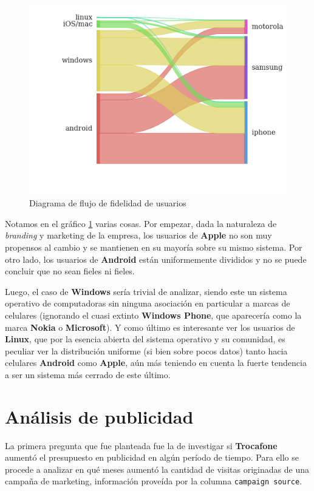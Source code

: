 \documentclass[a4paper]{article}
\begin{document}
\begin{figure}[h!]
	\includegraphics[width=\linewidth]{figures/151-os_brands-sankey.png}
	\caption{Diagrama de flujo de fidelidad de usuarios}
	\label{fig:sankey}
\end{figure}

Notamos en el gráfico \ref{fig:sankey} varias cosas. Por empezar, dada la naturaleza de \textit{branding} y marketing de la empresa, los usuarios de \textbf{Apple} no son muy propensos al cambio y se mantienen en su mayoría sobre su mismo sistema. Por otro lado, los usuarios de \textbf{Android} están uniformemente divididos y no se puede concluir que no sean fieles ni fieles. 

Luego, el caso de \textbf{Windows} sería trivial de analizar, siendo este un sistema operativo de computadoras sin ninguna asociación en particular a marcas de celulares (ignorando el cuasi extinto \textbf{Windows Phone}, que aparecería como la marca \textbf{Nokia} o \textbf{Microsoft}). Y como último es interesante ver los usuarios de \textbf{Linux}, que por la esencia abierta del sistema operativo y su comunidad, es peculiar ver la distribución uniforme (si bien sobre pocos datos) tanto hacia celulares \textbf{Android} como \textbf{Apple}, aún más teniendo en cuenta la fuerte tendencia a ser un sistema más cerrado de este último.

\section{Análisis de publicidad}

La primera pregunta que fue planteada fue la de investigar si \textbf{Trocafone} aumentó el presupuesto en publicidad en algún período de tiempo. Para ello se procede a analizar en qué meses aumentó la cantidad de visitas originadas de una campaña de marketing, información proveída por la columna \texttt{campaign source}.
\end{document}

